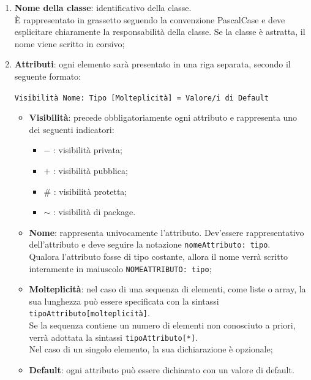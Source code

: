 \begin{enumerate}
    \item \textbf{Nome della classe}: identificativo della classe. \\
    È rappresentato in grassetto seguendo la convenzione PascalCase e deve esplicitare chiaramente la responsabilità della classe. Se la classe è astratta, il nome viene scritto in corsivo;
    \pagebreak
    \item \textbf{Attributi}: ogni elemento sarà presentato in una riga separata, secondo il seguente formato: \\
    \begin{center}\texttt{Visibilità Nome: Tipo [Molteplicità] = Valore/i di Default}\end{center}
    \begin{itemize}
        \item \textbf{Visibilità}: precede obbligatoriamente ogni attributo e rappresenta uno dei seguenti indicatori:
        \begin{itemize}
            \item $-$ : visibilità privata;
            \item $+$ : visibilità pubblica;
            \item $\#$ : visibilità protetta;
            \item $\sim$ : visibilità di package.
        \end{itemize}
        \item \textbf{Nome}: rappresenta univocamente l'attributo. Dev'essere rappresentativo dell'attributo e deve seguire la notazione \texttt{nomeAttributo: tipo}. \\
        Qualora l'attributo fosse di tipo costante, allora il nome verrà scritto interamente in maiuscolo \texttt{NOMEATTRIBUTO: tipo};
        \item \textbf{Molteplicità}: nel caso di una sequenza di elementi, come liste o array, la sua lunghezza può essere specificata con la sintassi \texttt{tipoAttributo[molteplicità]}. \\
        Se la sequenza contiene un numero di elementi non conosciuto a priori, verrà adottata la sintassi \texttt{tipoAttributo[*]}. \\
        Nel caso di un singolo elemento, la sua dichiarazione è opzionale;
        \item \textbf{Default}: ogni attributo può essere dichiarato con un valore di default.
    \end{itemize}
    

\end{enumerate}
